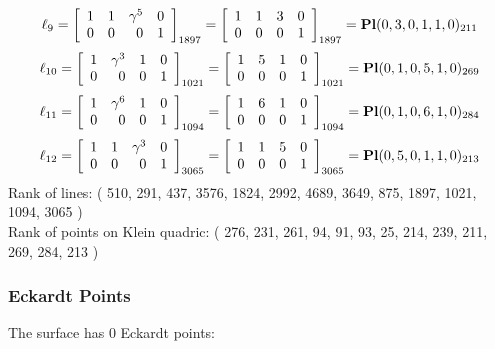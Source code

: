 \documentclass{article}
\begin{document}
{$$
\ell_{9} = 
\left[
\begin{array}{*{4}{r}}
1 & 1 & \gamma^{5} & 0\\
0 & 0 & 0 & 1\\
\end{array}
\right]
_{1897}
=
\left[
\begin{array}{*{4}c}
1  & 1  & 3  & 0\\
0  & 0  & 0  & 1\\
\end{array}
\right]_{1897}
={\rm\bf Pl}(0,3,0,1,1,0 )_{211}$$
$$
\ell_{10} = 
\left[
\begin{array}{*{4}{r}}
1 & \gamma^{3} & 1 & 0\\
0 & 0 & 0 & 1\\
\end{array}
\right]
_{1021}
=
\left[
\begin{array}{*{4}c}
1  & 5  & 1  & 0\\
0  & 0  & 0  & 1\\
\end{array}
\right]_{1021}
={\rm\bf Pl}(0,1,0,5,1,0 )_{269}$$
$$
\ell_{11} = 
\left[
\begin{array}{*{4}{r}}
1 & \gamma^{6} & 1 & 0\\
0 & 0 & 0 & 1\\
\end{array}
\right]
_{1094}
=
\left[
\begin{array}{*{4}c}
1  & 6  & 1  & 0\\
0  & 0  & 0  & 1\\
\end{array}
\right]_{1094}
={\rm\bf Pl}(0,1,0,6,1,0 )_{284}$$
$$
\ell_{12} = 
\left[
\begin{array}{*{4}{r}}
1 & 1 & \gamma^{3} & 0\\
0 & 0 & 0 & 1\\
\end{array}
\right]
_{3065}
=
\left[
\begin{array}{*{4}c}
1  & 1  & 5  & 0\\
0  & 0  & 0  & 1\\
\end{array}
\right]_{3065}
={\rm\bf Pl}(0,5,0,1,1,0 )_{213}$$
Rank of lines: ( 510, 291, 437, 3576, 1824, 2992, 4689, 3649, 875, 1897, 1021, 1094, 3065 )\\
Rank of points on Klein quadric: ( 276, 231, 261, 94, 91, 93, 25, 214, 239, 211, 269, 284, 213 )\\
\subsubsection*{Eckardt Points}
The surface has 0 Eckardt points:\\
}
\end{document}
